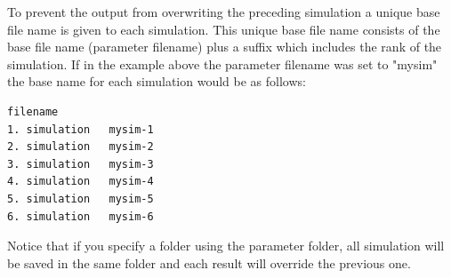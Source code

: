 \documentclass[letterpaper,12pt,oneside]{book}
\begin{document}
To prevent the output from overwriting the preceding simulation a unique base file name is given to each simulation. This unique base file name consists of the base file name (parameter \textsf{filename}) plus a suffix which includes the rank of the simulation. If in the example above the parameter \textsf{filename} was set to "mysim" the base name for each simulation would be as follows:
\begin{lstlisting}[frame=single]
                filename
1. simulation   mysim-1
2. simulation   mysim-2
3. simulation   mysim-3
4. simulation   mysim-4
5. simulation   mysim-5
6. simulation   mysim-6
\end{lstlisting}

Notice that if you specify a folder using the parameter \textsf{folder}, all simulation will be saved in the same folder and each result will override the previous one.
\newpage
\end{document}
